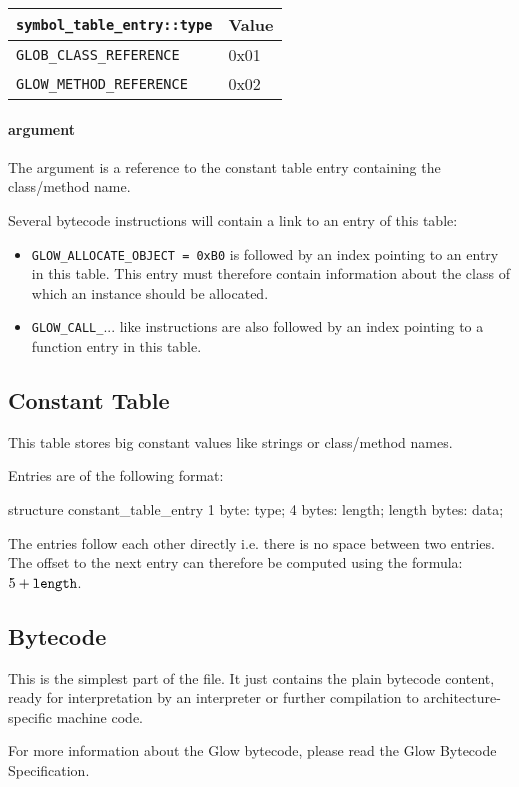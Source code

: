 \documentclass[12pt]{article}
\begin{document}
\begin{tabular}{| l | l |}
\hline
\verb|symbol_table_entry::type| & Value \\
\hline \hline
\verb|GLOB_CLASS_REFERENCE| & 0x01 \\
\hline
\verb|GLOW_METHOD_REFERENCE| & 0x02 \\
\hline
\end{tabular}

\paragraph{argument}
    The argument is a reference to the constant table entry containing the class/method name.

Several bytecode instructions will contain a link to an entry of this table:

\begin{itemize}
\item \verb|GLOW_ALLOCATE_OBJECT = 0xB0| is followed by an index pointing to an entry in this
    table. This entry must therefore contain information about the class of which an instance
    should be allocated.
\item \verb|GLOW_CALL_|... like instructions are also followed by an index pointing to a function
    entry in this table.
\end{itemize}

\subsection*{Constant Table}

This table stores big constant values like strings or class/method names.

Entries are of the following format:

\begin{code}[language=C]
structure constant_table_entry {
    1 byte:       type;
    4 bytes:      length;
    length bytes: data;
}
\end{code}

The entries follow each other directly i.e. there is no space between two entries. The offset
to the next entry can therefore be computed using the formula: \(5 + \verb|length|\).


\subsection*{Bytecode}

This is the simplest part of the file. It just contains the plain bytecode content, ready for interpretation
by an interpreter or further compilation to architecture-specific machine code.

For more information about the Glow bytecode, please read the Glow Bytecode Specification.
\end{document}
